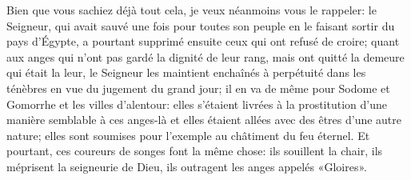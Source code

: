 Bien que vous sachiez déjà tout cela, je veux néanmoins vous le rappeler:
	le Seigneur, qui avait sauvé une fois pour toutes son peuple
		en le faisant sortir du pays d’Égypte,
	a pourtant supprimé ensuite ceux qui ont refusé de croire;
	quant aux anges qui n’ont pas gardé la dignité de leur rang,
	mais ont quitté la demeure qui était la leur,
	le Seigneur les maintient enchaînés à perpétuité dans les ténèbres
	en vue du jugement du grand jour;
	il en va de même pour Sodome et Gomorrhe et les villes d’alentour:
	elles s’étaient livrées à la prostitution
		d’une manière semblable à ces anges-là
	et elles étaient allées avec des êtres d’une autre nature;
	elles sont soumises pour l’exemple au châtiment du feu éternel.
Et pourtant, ces coureurs de songes font la même chose:
	ils souillent la chair, ils méprisent la seigneurie de Dieu,
	ils outragent les anges appelés «Gloires».
